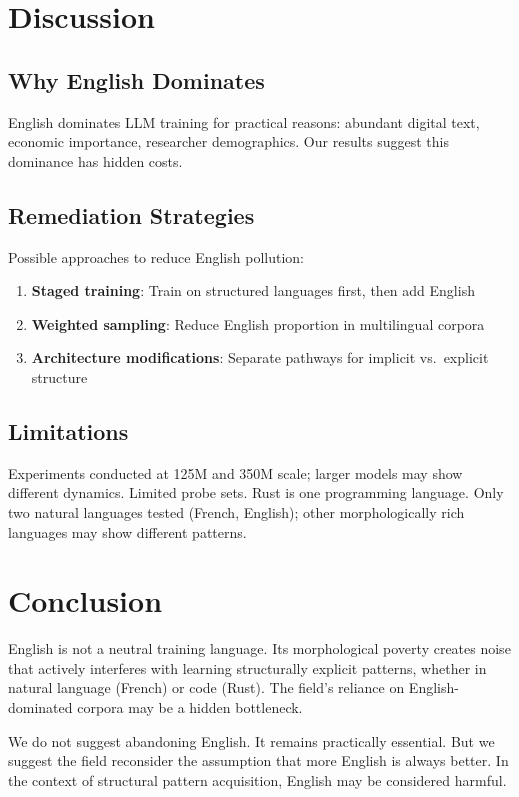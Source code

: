 \documentclass[11pt,a4paper]{article}
\begin{document}
\section{Discussion}

\subsection{Why English Dominates}

English dominates LLM training for practical reasons: abundant digital text, economic importance, researcher demographics. Our results suggest this dominance has hidden costs.

\subsection{Remediation Strategies}

Possible approaches to reduce English pollution:
\begin{enumerate}
    \item \textbf{Staged training}: Train on structured languages first, then add English
    \item \textbf{Weighted sampling}: Reduce English proportion in multilingual corpora
    \item \textbf{Architecture modifications}: Separate pathways for implicit vs.\ explicit structure
\end{enumerate}

\subsection{Limitations}

Experiments conducted at 125M and 350M scale; larger models may show different dynamics. Limited probe sets. Rust is one programming language. Only two natural languages tested (French, English); other morphologically rich languages may show different patterns.

\section{Conclusion}

English is not a neutral training language. Its morphological poverty creates noise that actively interferes with learning structurally explicit patterns, whether in natural language (French) or code (Rust). The field's reliance on English-dominated corpora may be a hidden bottleneck.

We do not suggest abandoning English. It remains practically essential. But we suggest the field reconsider the assumption that more English is always better. In the context of structural pattern acquisition, English may be considered harmful.
\end{document}
